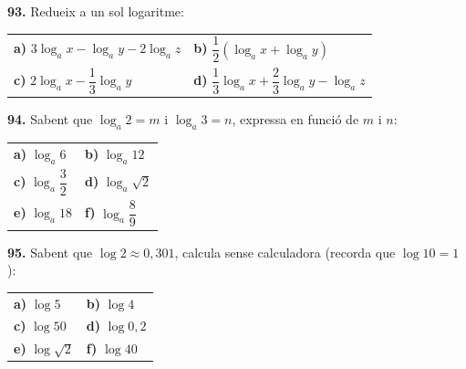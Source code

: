 \documentclass[13pt,a4paper]{extarticle}
\begin{document}
\par\noindent\begin{minipage}{\linewidth}
\textbf{93.} Redueix a un sol logaritme:\par

\begin{tabular}{@{}p{.46\linewidth}p{.46\linewidth}@{}}
\textbf{a)} $3\log_a x-\log_a y-2\log_a z$ & \textbf{b)} $\dfrac12\left(\log_a x+\log_a y\right)$ \\[2pt]
\textbf{c)} $2\log_a x-\dfrac13\log_a y$ & \textbf{d)} $\dfrac13\log_a x+\dfrac23\log_a y-\log_a z$ \\[2pt]
\end{tabular}\par
\end{minipage}\par\vspace{1.6mm}
\par\noindent\begin{minipage}{\linewidth}
\textbf{94.} Sabent que $\log_a 2=m$ i $\log_a 3=n$, expressa en funció de $m$ i $n$:\par

\begin{tabular}{@{}p{.46\linewidth}p{.46\linewidth}@{}}
\textbf{a)} $\log_a 6$ & \textbf{b)} $\log_a 12$ \\[2pt]
\textbf{c)} $\log_a \dfrac{3}{2}$ & \textbf{d)} $\log_a \sqrt{2}$ \\[2pt]
\textbf{e)} $\log_a 18$ & \textbf{f)} $\log_a \dfrac{8}{9}$ \\[2pt]
\end{tabular}\par
\end{minipage}\par\vspace{1.6mm}
\par\noindent\begin{minipage}{\linewidth}
\textbf{95.} Sabent que $\log 2 \approx 0{,}301$, calcula sense calculadora (recorda que $\log 10=1$):\par

\begin{tabular}{@{}p{.46\linewidth}p{.46\linewidth}@{}}
\textbf{a)} $\log 5$ & \textbf{b)} $\log 4$ \\[2pt]
\textbf{c)} $\log 50$ & \textbf{d)} $\log 0{,}2$ \\[2pt]
\textbf{e)} $\log \sqrt{2}$ & \textbf{f)} $\log 40$ \\[2pt]
\end{tabular}\par
\end{minipage}\par\vspace{1.6mm}
\end{document}
